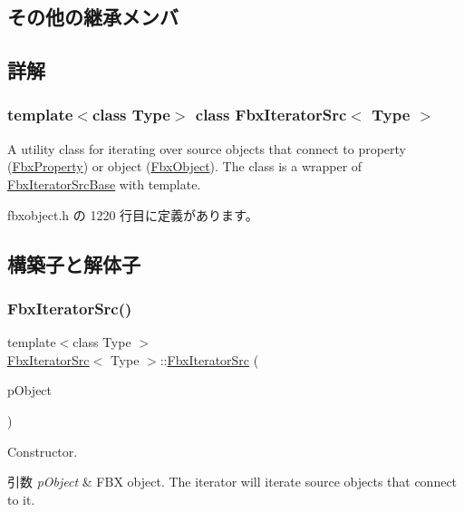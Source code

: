 \subsection*{その他の継承メンバ}


\subsection{詳解}
\subsubsection*{template$<$class Type$>$\newline
class Fbx\+Iterator\+Src$<$ Type $>$}

A utility class for iterating over source objects that connect to property (\hyperlink{class_fbx_property}{Fbx\+Property}) or object (\hyperlink{class_fbx_object}{Fbx\+Object}). The class is a wrapper of \hyperlink{class_fbx_iterator_src_base}{Fbx\+Iterator\+Src\+Base} with template. 

 fbxobject.\+h の 1220 行目に定義があります。



\subsection{構築子と解体子}
\mbox{\label{class_fbx_iterator_src_ad3a24f4ca3fe6adc2178e694e0ecd316}} 
\subsubsection{\texorpdfstring{Fbx\+Iterator\+Src()}{FbxIteratorSrc()}\hspace{0.1cm}{\footnotesize\ttfamily [1/2]}}
{\footnotesize\ttfamily template$<$class Type $>$ \\
\hyperlink{class_fbx_iterator_src}{Fbx\+Iterator\+Src}$<$ Type $>$\+::\hyperlink{class_fbx_iterator_src}{Fbx\+Iterator\+Src} (\begin{DoxyParamCaption}\item[{\hyperlink{class_fbx_object}{Fbx\+Object} $\ast$}]{p\+Object }\end{DoxyParamCaption})\hspace{0.3cm}{\ttfamily [inline]}}

Constructor. 
\begin{DoxyParams}{引数}
{\em p\+Object} & F\+BX object. The iterator will iterate source objects that connect to it. \\
\hline
\end{DoxyParams}


